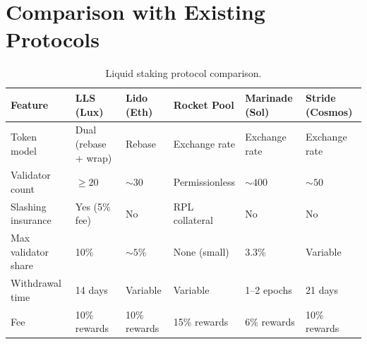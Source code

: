 \section{Comparison with Existing Protocols}
\label{sec:comparison}

\begin{table}[H]
\centering
\caption{Liquid staking protocol comparison.}
\label{tab:comparison}
\begin{tabular}{p{2.5cm}p{2cm}p{2cm}p{2cm}p{2cm}p{2cm}}
\toprule
\textbf{Feature} & \textbf{LLS (Lux)} & \textbf{Lido (Eth)} & \textbf{Rocket Pool} & \textbf{Marinade (Sol)} & \textbf{Stride (Cosmos)} \\
\midrule
Token model & Dual (rebase + wrap) & Rebase & Exchange rate & Exchange rate & Exchange rate \\
Validator count & $\geq 20$ & $\sim 30$ & Permissionless & $\sim 400$ & $\sim 50$ \\
Slashing insurance & Yes (5\% fee) & No & RPL collateral & No & No \\
Max validator share & 10\% & $\sim 5\%$ & None (small) & 3.3\% & Variable \\
Withdrawal time & 14 days & Variable & Variable & 1--2 epochs & 21 days \\
Fee & 10\% rewards & 10\% rewards & 15\% rewards & 6\% rewards & 10\% rewards \\
\bottomrule
\end{tabular}
\end{table}

